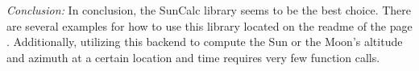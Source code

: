 \documentclass[10pt, onecolumn, draftclsnofoot, letterpaper, compsoc]{IEEEtran}
\begin{document}
\textit{Conclusion:} In conclusion, the SunCalc library seems to be the best
choice. There are several examples for how to use this library located on
the readme of the page \cite{SunCalc}. Additionally, utilizing this backend to
compute the Sun or the Moon's altitude and azimuth at a certain location
and time requires very few function calls.

\newpage


\end{document}
